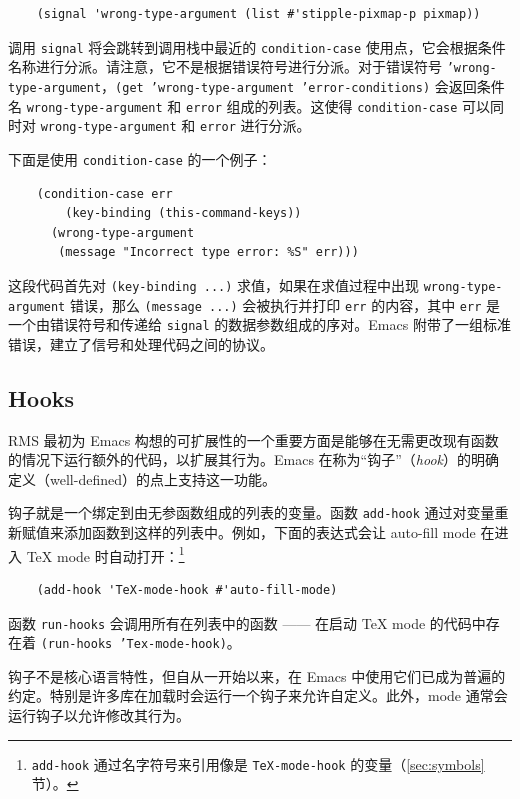 \documentclass[format=acmsmall,screen]{acmart}
\begin{document}
\begin{verbatim}
    (signal 'wrong-type-argument (list #'stipple-pixmap-p pixmap))
\end{verbatim}
调用 \texttt{signal} 将会跳转到调用栈中最近的 \texttt{condition-case} 使用点，它会根据条件名称进行分派。请注意，它不是根据错误符号进行分派。对于错误符号 \texttt{'wrong-type-argument}，\texttt{(get 'wrong-type-argument 'error-conditions)} 会返回条件名 \texttt{wrong-type-argument} 和 \texttt{error} 组成的列表。这使得 \texttt{condition-case} 可以同时对 \texttt{wrong-type-argument} 和 \texttt{error} 进行分派。

下面是使用 \texttt{condition-case} 的一个例子：
\begin{Verbatim}
    (condition-case err
        (key-binding (this-command-keys))
      (wrong-type-argument
       (message "Incorrect type error: %S" err)))
\end{Verbatim}
这段代码首先对 \texttt{(key-binding ...)} 求值，如果在求值过程中出现 \texttt{wrong-type-argument} 错误，那么 \texttt{(message ...)} 会被执行并打印 \texttt{err} 的内容，其中 \texttt{err} 是一个由错误符号和传递给 \texttt{signal} 的数据参数组成的序对。Emacs 附带了一组标准错误，建立了信号和处理代码之间的协议。

\subsection{Hooks}
\label{sec:hooks}
\label{sec:advice}

RMS 最初为 Emacs 构想的可扩展性的一个重要方面是能够在无需更改现有函数的情况下运行额外的代码，以扩展其行为。Emacs 在称为“钩子”（\emph{hook}）的明确定义（well-defined）的点上支持这一功能。

钩子就是一个绑定到由无参函数组成的列表的变量。函数 \texttt{add-hook} 通过对变量重新赋值来添加函数到这样的列表中。例如，下面的表达式会让 auto-fill mode 在进入 \TeX{} mode 时自动打开：\footnote{\texttt{add-hook} 通过名字符号来引用像是 \texttt{TeX-mode-hook} 的变量（\ref{sec:symbols} 节）。}

\begin{verbatim}
    (add-hook 'TeX-mode-hook #'auto-fill-mode)
\end{verbatim}

函数 \texttt{run-hooks} 会调用所有在列表中的函数 —— 在启动 \TeX{} mode 的代码中存在着 \texttt{(run-hooks 'Tex-mode-hook)}。

钩子不是核心语言特性，但自从一开始以来，在 Emacs 中使用它们已成为普遍的约定。特别是许多库在加载时会运行一个钩子来允许自定义。此外，mode 通常会运行钩子以允许修改其行为。
\end{document}
